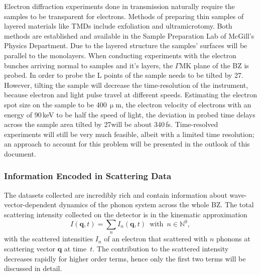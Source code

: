 Electron diffraction experiments done in transmission naturally require the samples to be transparent for electrons.
Methods of preparing thin samples of layered materials like \acp{TMD} include exfoliation\cite{mak2010} and ultramicrotomy\cite{malis1990}.
Both methods are established and available in the Sample Preparation Lab of McGill's Physics Department.
Due to the layered structure the samples' surfaces will be parallel to the monolayers.
When conducting experiments with the electron bunches arriving normal to \ts\space samples and it's layers, the $\Gamma\mathrm{MK}$ plane of the \ac{BZ} is probed.
In order to probe the L points of \ts\space the sample needs to be tilted by 27\textdegree.
However, tilting the sample will decrease the time-resolution of the instrument, because electron and light pulse travel at different speeds.
Estimating the electron spot size on the sample to be 400\,$\upmu$m, the electron velocity of electrons with an energy of 90\,keV to be half the speed of light, the deviation in probed time delays across the sample area tilted by 27\textdegree will be about 340\,fs.
Time-resolved experiments will still be very much feasible, albeit with a limited time resolution; an approach to account for this problem will be presented in the outlook of this document.

\subsubsection*{Information Encoded in Scattering Data}
The datasets collected are incredibly rich and contain information about wave-vector-dependent dynamics of the phonon system across the whole \ac{BZ}.
The total scattering intensity collected on the detector is in the kinematic approximation
\begin{equation} I(\mathbf{q},t) = \sum_n I_n(\mathbf{q},t)\enspace\text{with}\enspace n \in\mathbb{N}^0,\label{eq:I}\end{equation}
with the scattered intensities $I_n$ of an electron that scattered with $n$ phonons at scattering vector $\mathbf{q}$ at time~$t$.
The contribution to the scattered intensity decreases rapidly for higher order terms, hence only the first two terms will be discussed in detail.


